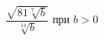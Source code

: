 \begin{ex}
	\begin{condition}
		\( \dfrac{\sqrt{81\sqrt[7]{b}}}{\sqrt[14]{b}} \) при \( b>0 \)
	\end{condition}
\end{ex}